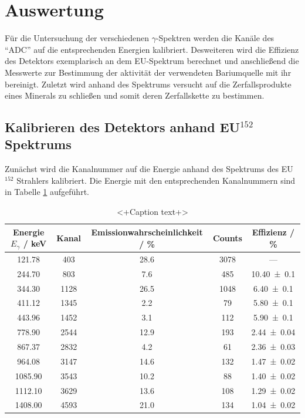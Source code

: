 \section{Auswertung}
\label{sec:Auswertung}
Für die Untersuchung der verschiedenen $\gamma$-Spektren werden die Kanäle des ``ADC'' auf die entsprechenden Energien kalibriert. Desweiteren wird die Effizienz des Detektors exemplarisch an dem EU-Spektrum berechnet und anschließend die Messwerte zur Bestimmung der aktivität der verwendeten Bariumquelle mit ihr bereinigt. Zuletzt wird anhand des Spektrums versucht auf die Zerfallsprodukte eines Minerals zu schließen und somit deren Zerfallskette zu bestimmen.
\subsection{Kalibrieren des Detektors anhand EU$^{152}$ Spektrums}
Zunächst wird die Kanalnummer auf die Energie anhand des Spektrums des EU$^{152}$ Strahlers kalibriert. Die Energie mit den entsprechenden Kanalnummern sind in Tabelle \ref{tab:CsSpekt} aufgeführt.
\begin{table}
  \centering
  \begin{tabular}{c | c c c c}
    \toprule
    Energie $E_{\gamma}$ / keV& Kanal & Emissionwahrscheinlichkeit / \% & Counts & Effizienz / \% \\	
    \hline
    121.78	& 403	& 28.6	& 3078 	& ---	\\
    244.70	& 803	& 7.6	& 485 	& \num{10.40 +- 0.1}	\\
    344.30	& 1128	& 26.5	& 1048	& \num{6.40 +- 0.1}	\\
    411.12	& 1345	& 2.2	& 79	& \num{5.80 +- 0.1}	\\
    443.96	& 1452	& 3.1	& 112 	& \num{5.90 +- 0.1}	\\
    778.90	& 2544	& 12.9	& 193	& \num{2.44 +- 0.04}	\\
    867.37	& 2832	& 4.2	& 61	& \num{2.36 +- 0.03}	\\
    964.08	& 3147	& 14.6	& 132	& \num{1.47 +- 0.02}	\\
    1085.90	& 3543	& 10.2	& 88	& \num{1.40 +- 0.02}	\\
    1112.10	& 3629	& 13.6	& 108	& \num{1.29 +- 0.02}	\\
    1408.00	& 4593	& 21.0 	& 134	& \num{1.04 +- 0.02}	\\
    \bottomrule
  \end{tabular}
  \caption{<+Caption text+>}
  \label{tab:CsSpekt}
\end{table} 
